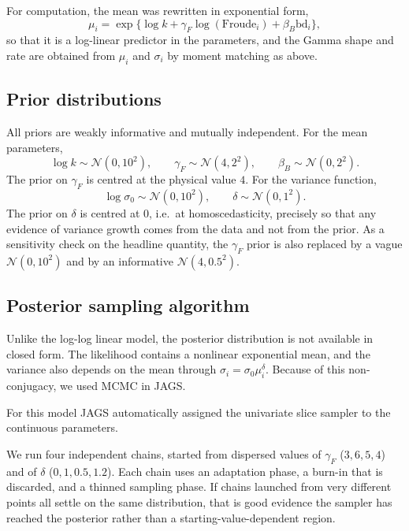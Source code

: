 \documentclass[12pt,a4paper]{article}
\begin{document}
For computation, the mean was rewritten in exponential form,
\begin{equation}
\mu_i
=
\exp\{\log k+\gamma_F \log(\mathrm{Froude}_i)+\beta_B \mathrm{bd}_i\},
\end{equation}
so that it is a log-linear predictor in the parameters, and the Gamma shape and rate are obtained
from $\mu_i$ and $\sigma_i$ by moment matching as above.




\subsection{Prior distributions}
\label{sec:t3-prior}

All priors are weakly informative and mutually independent. For the mean
parameters,
\begin{equation}
  \log k \sim \mathcal{N}(0,10^2),
  \qquad
  \gamma_F \sim \mathcal{N}(4,2^2),
  \qquad
  \beta_B \sim \mathcal{N}(0,2^2).
  \label{eq:t3-prior-mean}
\end{equation}
The prior on $\gamma_F$ is centred at the physical value $4$. For the variance function,
\begin{equation}
  \log\sigma_0 \sim \mathcal{N}(0,10^2),
  \qquad
  \delta \sim \mathcal{N}(0,1^2).
  \label{eq:t3-prior-var}
\end{equation}
The prior on $\delta$ is centred at $0$, i.e.\ at homoscedasticity, precisely so
that any evidence of variance growth comes from the data and not from the prior.
As a sensitivity check on the headline quantity, the $\gamma_F$ prior is also
replaced by a vague $\mathcal{N}(0,10^2)$ and by an informative
$\mathcal{N}(4,0.5^2)$.

\subsection{Posterior sampling algorithm}
\label{sec:t3-algorithm}

Unlike the log-log linear model, the posterior distribution is not available in closed form.
The likelihood contains a nonlinear exponential mean, and the variance also depends on the mean through $\sigma_i=\sigma_0\mu_i^\delta$. Because of this non-conjugacy, we used MCMC in JAGS.

For this model JAGS automatically assigned the univariate slice sampler to the continuous parameters.

We run four independent chains, started from dispersed values of $\gamma_F$ ($3,6,5,4$) and of $\delta$ ($0,1,0.5,1.2$).
Each chain uses an adaptation phase, a burn-in that is discarded, and a thinned sampling phase.
If chains launched from very different points all settle on the same
distribution, that is good evidence the sampler has reached the posterior rather
than a starting-value-dependent region.
\end{document}
